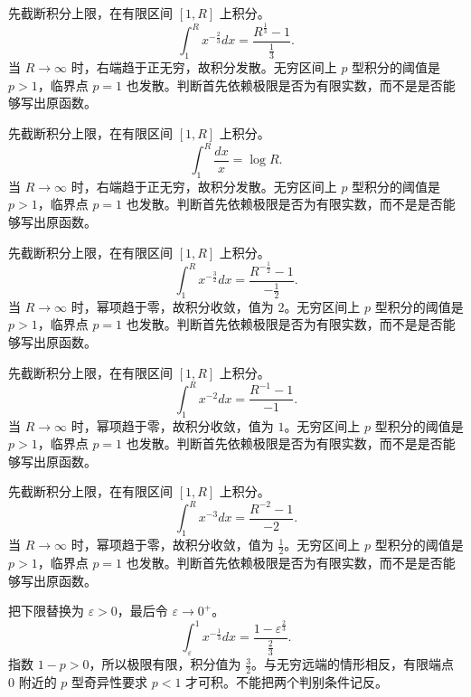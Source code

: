 \documentclass[UTF8,12pt,a4paper,fontset=fandol]{ctexart}
\begin{document}
\begin{solve}\label{ans:c19q3}
先截断积分上限，在有限区间 $[1,R]$ 上积分。
\[
\int_1^Rx^{-\frac{2}{3}}dx=\frac{R^{\frac{1}{3}}-1}{\frac{1}{3}}.
\]
当 $R\to\infty$ 时，右端趋于正无穷，故积分发散。无穷区间上 $p$ 型积分的阈值是 $p>1$，临界点 $p=1$ 也发散。判断首先依赖极限是否为有限实数，而不是是否能够写出原函数。
\end{solve}

\begin{solve}\label{ans:c19q4}
先截断积分上限，在有限区间 $[1,R]$ 上积分。
\[
\int_1^R\frac{dx}{x}=\log R.
\]
当 $R\to\infty$ 时，右端趋于正无穷，故积分发散。无穷区间上 $p$ 型积分的阈值是 $p>1$，临界点 $p=1$ 也发散。判断首先依赖极限是否为有限实数，而不是是否能够写出原函数。
\end{solve}

\begin{solve}\label{ans:c19q5}
先截断积分上限，在有限区间 $[1,R]$ 上积分。
\[
\int_1^Rx^{-\frac{3}{2}}dx=\frac{R^{-\frac{1}{2}}-1}{-\frac{1}{2}}.
\]
当 $R\to\infty$ 时，幂项趋于零，故积分收敛，值为 $2$。无穷区间上 $p$ 型积分的阈值是 $p>1$，临界点 $p=1$ 也发散。判断首先依赖极限是否为有限实数，而不是是否能够写出原函数。
\end{solve}

\begin{solve}\label{ans:c19q6}
先截断积分上限，在有限区间 $[1,R]$ 上积分。
\[
\int_1^Rx^{-2}dx=\frac{R^{-1}-1}{-1}.
\]
当 $R\to\infty$ 时，幂项趋于零，故积分收敛，值为 $1$。无穷区间上 $p$ 型积分的阈值是 $p>1$，临界点 $p=1$ 也发散。判断首先依赖极限是否为有限实数，而不是是否能够写出原函数。
\end{solve}

\begin{solve}\label{ans:c19q7}
先截断积分上限，在有限区间 $[1,R]$ 上积分。
\[
\int_1^Rx^{-3}dx=\frac{R^{-2}-1}{-2}.
\]
当 $R\to\infty$ 时，幂项趋于零，故积分收敛，值为 $\frac{1}{2}$。无穷区间上 $p$ 型积分的阈值是 $p>1$，临界点 $p=1$ 也发散。判断首先依赖极限是否为有限实数，而不是是否能够写出原函数。
\end{solve}

\begin{solve}\label{ans:c19q8}
把下限替换为 $\varepsilon>0$，最后令 $\varepsilon\to0^+$。
\[
\int_\varepsilon^1x^{-\frac{1}{3}}dx=\frac{1-\varepsilon^{\frac{2}{3}}}{\frac{2}{3}}.
\]
指数 $1-p>0$，所以极限有限，积分值为 $\frac{3}{2}$。与无穷远端的情形相反，有限端点 $0$ 附近的 $p$ 型奇异性要求 $p<1$ 才可积。不能把两个判别条件记反。
\end{solve}
\end{document}
